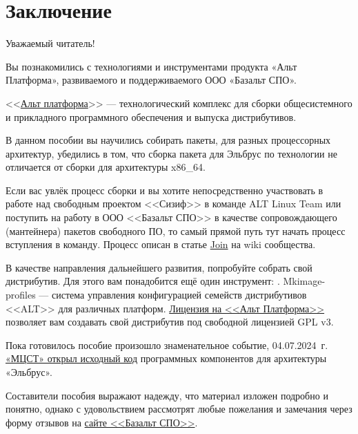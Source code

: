 \chapter*{Заключение}

Уважаемый читатель! 

Вы познакомились с технологиями и инструментами продукта «Альт Платформа», 
развиваемого и поддерживаемого ООО «Базальт СПО». 

<<\href{https://www.basealt.ru/alt-platform}{Альт платформа}>> --- 
технологический комплекс для сборки общесистемного 
и прикладного программного обеспечения и выпуска дистрибутивов. 

В данном пособии вы научились собирать пакеты, для разных процессорных архитектур,
убедились в том, что сборка пакета для Эльбрус по технологии не отличается от сборки для 
архитектуры x86\_64. 

Если вас увлёк процесс сборки и вы хотите непосредственно участвовать в работе над свободным 
проектом <<Сизиф>> в команде ALT Linux Team или поступить 
на работу в ООО <<Базальт СПО>> в качестве сопровождающего (мантейнера) пакетов свободного ПО, 
то самый прямой путь тут начать процесс вступления в команду. Процесс описан в статье 
\href{https://www.altlinux.org/Join}{Join} на wiki сообщества. 

В качестве направления дальнейшего развития, попробуйте 
собрать свой дистрибутив. Для этого вам понадобится ещё один 
инструмент: \href{https://www.altlinux.org/Mkimage-profiles}{}.
Mkimage-profiles --- система управления конфигурацией семейств дистрибутивов <<ALT>> для различных платформ.
\href{https://www.basealt.ru/fileadmin/docs/License_Alt-Platform_10.pdf}{Лицензия на <<Альт Платформа>>} 
позволяет вам создавать свой дистрибутив под свободной лицензией GPL v3.

Пока готовилось пособие произошло знаменательное событие, 04.07.2024~г. \href{https://arppsoft.ru/news/arpp/16516/}{%
	«МЦСТ» открыл исходный код} программных компонентов для архитектуры «Эльбрус».

Составители пособия выражают надежду, что материал изложен подробно и понятно, 
однако с удовольствием рассмотрят любые пожелания и замечания через форму отзывов 
на \href{https://www.basealt.ru/contacts}{сайте <<Базальт СПО>>}.
